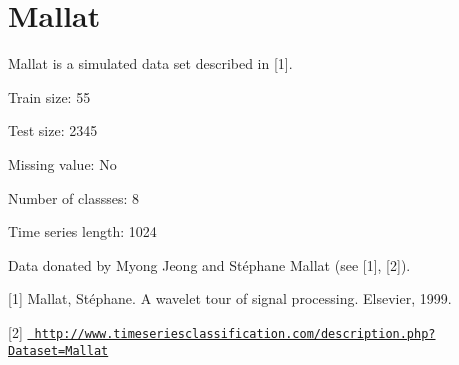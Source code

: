 \chapter{Mallat}
\hypertarget{md_external_2data_2UCRArchive__2018_2Mallat_2README}{}\label{md_external_2data_2UCRArchive__2018_2Mallat_2README}
\label{md_external_2data_2UCRArchive__2018_2Mallat_2README_autotoc_md136}%
%
 Mallat is a simulated data set described in \mbox{[}1\mbox{]}.

Train size\+: 55

Test size\+: 2345

Missing value\+: No

Number of classses\+: 8

Time series length\+: 1024

Data donated by Myong Jeong and Stéphane Mallat (see \mbox{[}1\mbox{]}, \mbox{[}2\mbox{]}).

\mbox{[}1\mbox{]} Mallat, Stéphane. A wavelet tour of signal processing. Elsevier, 1999.

\mbox{[}2\mbox{]} \href{http://www.timeseriesclassification.com/description.php?Dataset=Mallat}{\texttt{ http\+://www.\+timeseriesclassification.\+com/description.\+php?\+Dataset=\+Mallat}} 